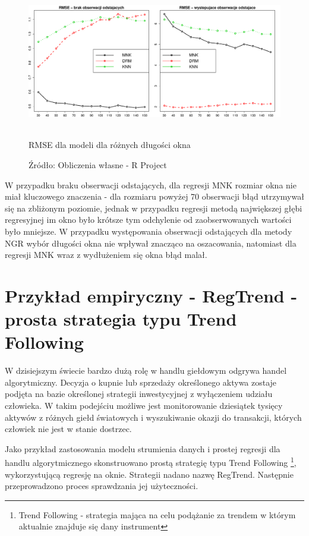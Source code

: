 \documentclass[man,mfu]{mgrwms}
\begin{document}
\begin{figure}[H]
\centering
\includegraphics[width=160mm,height = 60mm]{rmse}
\caption{RMSE dla modeli dla różnych długości okna}
\caption*{Źródło: Obliczenia własne - R Project}
\label{fig:window}
\end{figure}

W przypadku braku obserwacji odstających, dla regresji MNK rozmiar okna nie miał kluczowego znaczenia - dla rozmiaru powyżej 70 obserwacji błąd utrzymywał się na zbliżonym poziomie, jednak w przypadku regresji metodą największej głębi regresyjnej im okno było krótsze tym odchylenie od zaobserwowanych wartości było mniejsze. W przypadku występowania obserwacji odstających dla metody NGR wybór długości okna nie wpływał znacząco na oszacowania, natomiast dla regresji MNK wraz z wydłużeniem się okna błąd malał.

\mgrclosechapter



\chapter{Przykład empiryczny - RegTrend - prosta strategia typu Trend Following}

W dzisiejszym świecie bardzo dużą rolę w handlu giełdowym odgrywa handel algorytmiczny. Decyzja o kupnie lub sprzedaży określonego aktywa zostaje podjęta na bazie określonej strategii inwestycyjnej z wyłączeniem udziału człowieka. W takim podejściu możliwe jest monitorowanie dziesiątek tysięcy aktywów z różnych giełd światowych i wyszukiwanie okazji do transakcji, których człowiek nie jest w stanie dostrzec.

Jako przykład zastosowania modelu strumienia danych i prostej regresji dla handlu algorytmicznego skonstruowano prostą strategię typu Trend Following \footnote{Trend Following - strategia mająca na celu podążanie za trendem w którym aktualnie znajduje się dany instrument}, wykorzystującą regresję na oknie. Strategii nadano nazwę RegTrend. Następnie przeprowadzono proces sprawdzania jej użyteczności.
\end{document}
